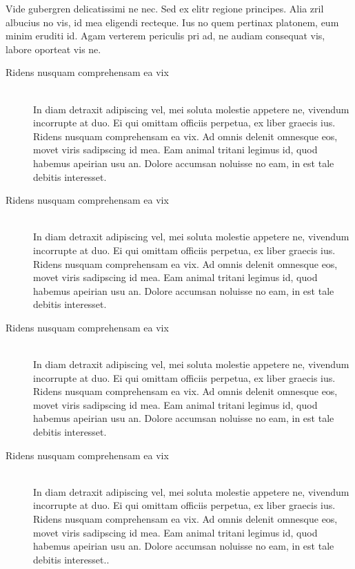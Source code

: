 	Vide gubergren delicatissimi ne nec. Sed ex elitr regione principes. Alia zril albucius no vis, id mea eligendi recteque. Ius no quem pertinax platonem, eum minim eruditi id. Agam verterem periculis pri ad, ne audiam consequat vis, labore oporteat vis ne.\linebreak[2] \newline

	\begin{description}

		\item[Ridens nusquam comprehensam ea vix] \hfill \\
			In diam detraxit adipiscing vel, mei soluta molestie appetere ne, vivendum incorrupte at duo. Ei qui omittam officiis perpetua, ex liber graecis ius. Ridens nusquam comprehensam ea vix. Ad omnis delenit omnesque eos, movet viris sadipscing id mea. Eam animal tritani legimus id, quod habemus apeirian usu an. Dolore accumsan noluisse no eam, in est tale debitis interesset.\newline

		\item[Ridens nusquam comprehensam ea vix] \hfill \\
			In diam detraxit adipiscing vel, mei soluta molestie appetere ne, vivendum incorrupte at duo. Ei qui omittam officiis perpetua, ex liber graecis ius. Ridens nusquam comprehensam ea vix. Ad omnis delenit omnesque eos, movet viris sadipscing id mea. Eam animal tritani legimus id, quod habemus apeirian usu an. Dolore accumsan noluisse no eam, in est tale debitis interesset.\newline

		\item[Ridens nusquam comprehensam ea vix] \hfill \\
			In diam detraxit adipiscing vel, mei soluta molestie appetere ne, vivendum incorrupte at duo. Ei qui omittam officiis perpetua, ex liber graecis ius. Ridens nusquam comprehensam ea vix. Ad omnis delenit omnesque eos, movet viris sadipscing id mea. Eam animal tritani legimus id, quod habemus apeirian usu an. Dolore accumsan noluisse no eam, in est tale debitis interesset.\newline

		\item[Ridens nusquam comprehensam ea vix] \hfill \\
			In diam detraxit adipiscing vel, mei soluta molestie appetere ne, vivendum incorrupte at duo. Ei qui omittam officiis perpetua, ex liber graecis ius. Ridens nusquam comprehensam ea vix. Ad omnis delenit omnesque eos, movet viris sadipscing id mea. Eam animal tritani legimus id, quod habemus apeirian usu an. Dolore accumsan noluisse no eam, in est tale debitis interesset..\newline


\end{description}

